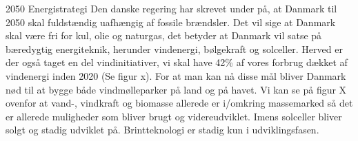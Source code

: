 2050 Energistrategi
Den danske regering har skrevet under på, at Danmark til 2050 skal fuldstændig uafhængig af fossile brændsler. Det vil sige at Danmark skal være fri for kul, olie og naturgas, det betyder at Danmark vil satse på bæredygtig energiteknik, herunder vindenergi, bølgekraft og solceller. Herved er der også taget en del vindinitiativer, vi skal have 42\% af vores forbrug dækket af vindenergi inden 2020 (Se figur x). For at man kan nå disse mål bliver Danmark nød til at bygge både vindmølleparker på land og på havet. Vi kan se på figur X ovenfor at vand-, vindkraft og biomasse allerede er i/omkring massemarked så det er allerede muligheder som bliver brugt og videreudviklet. Imens solceller bliver solgt og stadig udviklet på. Brintteknologi er stadig kun i udviklingsfasen. 